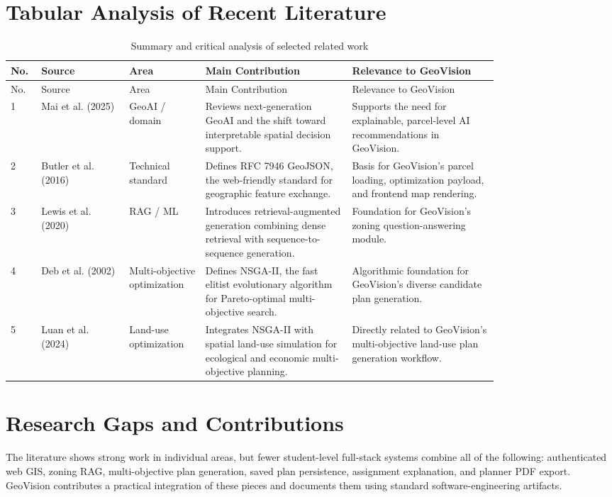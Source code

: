 \documentclass[12pt,a4paper,oneside]{report}
\begin{document}
\section{Tabular Analysis of Recent Literature}
{\setlength{\tabcolsep}{4pt}
\begin{longtable}{p{0.03\linewidth}p{0.15\linewidth}p{0.12\linewidth}p{0.25\linewidth}p{0.25\linewidth}}
\caption{Summary and critical analysis of selected related work}\label{tab:literature}\\
\toprule
No. & Source & Area & Main Contribution & Relevance to GeoVision \\
\midrule
\endfirsthead
\toprule
No. & Source & Area & Main Contribution & Relevance to GeoVision \\
\midrule
\endhead
1 & Mai et al. (2025) \cite{mai2025geoai} & GeoAI / domain & Reviews next-generation GeoAI and the shift toward interpretable spatial decision support. & Supports the need for explainable, parcel-level AI recommendations in GeoVision. \\
2 & Butler et al. (2016) \cite{geojson2016} & Technical standard & Defines RFC 7946 GeoJSON, the web-friendly standard for geographic feature exchange. & Basis for GeoVision's parcel loading, optimization payload, and frontend map rendering. \\
3 & Lewis et al. (2020) \cite{lewis2020rag} & RAG / ML & Introduces retrieval-augmented generation combining dense retrieval with sequence-to-sequence generation. & Foundation for GeoVision's zoning question-answering module. \\
4 & Deb et al. (2002) \cite{deb2002nsga} & Multi-objective optimization & Defines NSGA-II, the fast elitist evolutionary algorithm for Pareto-optimal multi-objective search. & Algorithmic foundation for GeoVision's diverse candidate plan generation. \\
5 & Luan et al. (2024) \cite{luan2024landuse} & Land-use optimization & Integrates NSGA-II with spatial land-use simulation for ecological and economic multi-objective planning. & Directly related to GeoVision's multi-objective land-use plan generation workflow. \\
\bottomrule
\end{longtable}}

\section{Research Gaps and Contributions}
The literature shows strong work in individual areas, but fewer student-level full-stack systems combine all of the following: authenticated web GIS, zoning RAG, multi-objective plan generation, saved plan persistence, assignment explanation, and planner PDF export. GeoVision contributes a practical integration of these pieces and documents them using standard software-engineering artifacts.
\end{document}
